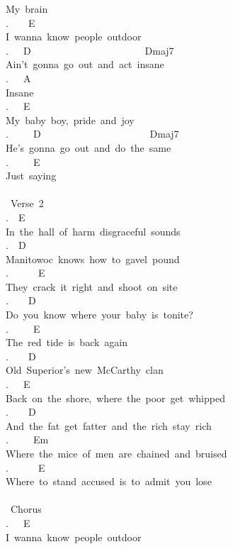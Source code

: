 {My\ brain\\
.\ \ \ \ E\\
I\ wanna\ know\ people\ outdoor\\
.\ \ \ D\ \ \ \ \ \ \ \ \ \ \ \ \ \ \ \ \ \ \ \ \ \ \ Dmaj7\\
Ain't\ gonna\ go\ out\ and\ act\ insane\\
.\ \ \ A\\
Insane\\
.\ \ \ E\\
My\ baby\ boy,\ pride\ and\ joy\\
.\ \ \ \ \ D\ \ \ \ \ \ \ \ \ \ \ \ \ \ \ \ \ \ \ \ \ \ Dmaj7\\
He's\ gonna\ go\ out\ and\ do\ the\ same\\
.\ \ \ \ \ E\\
Just\ saying\\
\\
\lbrack\ Verse\ 2\rbrack\\
.\ \ E\\
In\ the\ hall\ of\ harm\ disgraceful\ sounds\\
.\ \ D\\
Manitowoc\ knows\ how\ to\ gavel\ pound\\
.\ \ \ \ \ \ E\\
They\ crack\ it\ right\ and\ shoot\ on\ site\\
.\ \ \ \ D\\
Do\ you\ know\ where\ your\ baby\ is\ tonite?\\
.\ \ \ \ \ E\\
The\ red\ tide\ is\ back\ again\\
.\ \ \ \ D\\
Old\ Superior's\ new\ McCarthy\ clan\\
.\ \ \ E\\
Back\ on\ the\ shore,\ where\ the\ poor\ get\ whipped\\
.\ \ \ \ D\\
And\ the\ fat\ get\ fatter\ and\ the\ rich\ stay\ rich\\
.\ \ \ \ \ Em\\
Where\ the\ mice\ of\ men\ are\ chained\ and\ bruised\\
.\ \ \ \ \ \ E\\
Where\ to\ stand\ accused\ is\ to\ admit\ you\ lose\\
\\
\lbrack\ Chorus\rbrack\\
.\ \ \ E\\
I\ wanna\ know\ people\ outdoor\\
}
